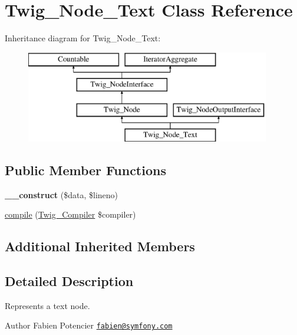 \hypertarget{class_twig___node___text}{}\section{Twig\+\_\+\+Node\+\_\+\+Text Class Reference}
\label{class_twig___node___text}
Inheritance diagram for Twig\+\_\+\+Node\+\_\+\+Text\+:\begin{figure}[H]
\begin{center}
\leavevmode
\includegraphics[height=4.000000cm]{class_twig___node___text}
\end{center}
\end{figure}
\subsection*{Public Member Functions}
\begin{DoxyCompactItemize}
\item 
\hypertarget{class_twig___node___text_af456fd2c3110f37c58c62fbd5e5fa4e1}{}{\bfseries \+\_\+\+\_\+construct} (\$data, \$lineno)\label{class_twig___node___text_af456fd2c3110f37c58c62fbd5e5fa4e1}

\item 
\hyperlink{class_twig___node___text_a4e0faa87c3fae583620b84d3607085da}{compile} (\hyperlink{class_twig___compiler}{Twig\+\_\+\+Compiler} \$compiler)
\end{DoxyCompactItemize}
\subsection*{Additional Inherited Members}


\subsection{Detailed Description}
Represents a text node.

\begin{DoxyAuthor}{Author}
Fabien Potencier \href{mailto:fabien@symfony.com}{\tt fabien@symfony.\+com} 
\end{DoxyAuthor}


